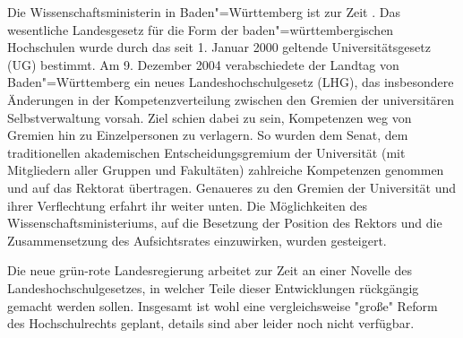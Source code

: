 Die Wissenschaftsministerin in Baden"=Württemberg ist zur Zeit \wissenschaftsministerbawue .
Das wesentliche Landesgesetz für die Form der
baden"=württembergischen Hochschulen wurde durch das seit 1. Januar 2000
geltende Universitätsgesetz (UG) bestimmt. Am 9. Dezember 2004
verabschiedete der Landtag von Baden"=Württemberg ein neues
Landeshochschulgesetz (LHG), das insbesondere Änderungen in der
Kompetenzverteilung zwischen den Gremien der universitären
Selbstverwaltung vorsah. Ziel schien dabei zu sein, Kompetenzen weg von
Gremien hin zu Einzelpersonen zu verlagern. So wurden dem Senat, dem
traditionellen akademischen Entscheidungsgremium der Universität (mit
Mitgliedern aller Gruppen und Fakultäten) zahlreiche Kompetenzen genommen
und auf das Rektorat übertragen. Genaueres zu den Gremien der Universität
und ihrer Verflechtung erfahrt ihr weiter unten. Die Möglichkeiten des
Wissenschaftsministeriums, auf die Besetzung der Position des Rektors und
die Zusammensetzung des Aufsichtsrates einzuwirken, wurden gesteigert.

Die neue grün-rote Landesregierung arbeitet zur Zeit an einer Novelle
des Landeshochschulgesetzes, in welcher Teile dieser Entwicklungen
rückgängig gemacht werden sollen. Insgesamt ist wohl eine vergleichsweise
"große" Reform des Hochschulrechts geplant, details sind aber leider noch
nicht verfügbar.

\Large{}\normalfont\small\\ \quad \\

